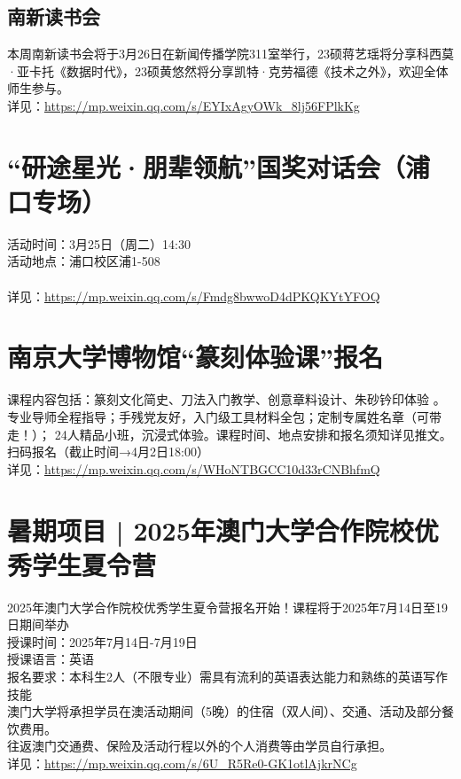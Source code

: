\documentclass[letterpaper, 12pt]{article}
\begin{document}
\begin{multicols}{2}
\subsection{南新读书会}
本周南新读书会将于3月26日在新闻传播学院311室举行，23硕蒋艺瑶将分享科西莫·亚卡托《数据时代》，23硕黄悠然将分享凯特·克劳福德《技术之外》，欢迎全体师生参与。
\\详见：\url{https://mp.weixin.qq.com/s/EYIxAgyOWk_8lj56FPlkKg}

\section{“研途星光·朋辈领航”国奖对话会（浦口专场）}
活动时间：3月25日（周二）14:30
\\活动地点：浦口校区浦1-508
\\
\\详见：\url{https://mp.weixin.qq.com/s/Fmdg8bwwoD4dPKQKYtYFOQ}


\section{南京大学博物馆“篆刻体验课”报名}
课程内容包括：篆刻文化简史、刀法入门教学、创意章料设计、朱砂钤印体验 。专业导师全程指导；手残党友好，入门级工具材料全包；定制专属姓名章（可带走！）； 24人精品小班，沉浸式体验。课程时间、地点安排和报名须知详见推文。
\\扫码报名（截止时间→4月2日18:00）
\\详见：\url{https://mp.weixin.qq.com/s/WHoNTBGCC10d33rCNBhfmQ}
\section{暑期项目 | 2025年澳门大学合作院校优秀学生夏令营}
2025年澳门大学合作院校优秀学生夏令营报名开始！课程将于2025年7月14日至19日期间举办
\\授课时间：2025年7月14日-7月19日
\\授课语言：英语
\\报名要求：本科生2人（不限专业）需具有流利的英语表达能力和熟练的英语写作技能
\\澳门大学将承担学员在澳活动期间（5晚）的住宿（双人间）、交通、活动及部分餐饮费用。
\\往返澳门交通费、保险及活动行程以外的个人消费等由学员自行承担。
\\详见：\url{https://mp.weixin.qq.com/s/6U_R5Re0-GK1otlAjkrNCg}

\end{multicols}
\end{document}
